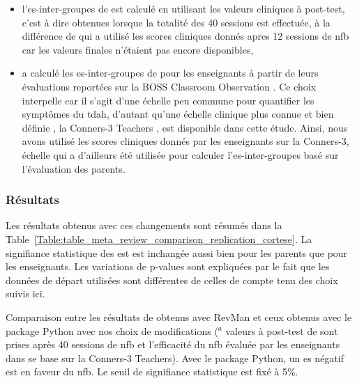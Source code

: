 \begin{itemize}
\item l'\gls{es}-inter-groupes de \citet{Arnold2014} est calculé en utilisant les valeurs cliniques à post-test, c'est à dire obtenues lorsque la totalité 
des 40 sessions est effectuée, à la différence de \citet{Cortese2016} qui a utilisé les scores cliniques donnés apres 12 sessions de \gls{nfb} car les valeurs 
finales n'étaient pas encore disponibles,
\item \citet{Cortese2016} a calculé les \gls{es}-inter-groupes de \citet{Steiner2014} pour les enseignants à partir de leurs évaluations reportées sur 
la BOSS Classroom Observation \citep{Shapiro2010}. Ce choix interpelle car il s'agit d'une échelle peu commune pour quantifier les symptômes du \gls{tdah}, d'autant qu'une échelle clinique 
plus connue et bien définie \citep{Collett2003, Epstein2012, Bluschke2016}, la Conners-3 Teachers \citep{Conners1998, Conners2008}, est disponible dans 
cette étude. Ainsi, nous avons utilisé les scores cliniques donnés par les enseignants sur la Conners-3, échelle 
qui a d'ailleurs été utilisée pour calculer l'\gls{es}-inter-groupes basé sur l'évaluation des parents. 
\end{itemize}

\subsubsection{Résultats}

Les résultats obtenus avec ces changements sont résumés dans la Table~\ref{Table:table_meta_review_comparison_replication_cortese}.
La signifiance statistique des \gls{est} est inchangée aussi bien pour les parents que pour les enseignants. Les variations de p-values sont expliquées
par le fait que les données de départ utilisées sont différentes de celles de \citet{Cortese2016} compte tenu des choix suivis ici.

\begin{table}[h!]
  \centering
  \caption{Comparaison entre les résultats de \citet{Cortese2016} obtenus avec RevMan \citep{Revman} et ceux obtenus avec le package Python \citep{Bussalb2019clinical}
	avec nos choix de modifications ($^a$ valeurs à post-test de \citet{Arnold2014} sont prises après 40 sessions de \gls{nfb} et l'efficacité du \gls{nfb} évaluée 
	par les enseignants dans \citet{Steiner2014} se base sur la Conners-3 Teachers).
	Avec le package Python, un \gls{es} négatif est en faveur du \gls{nfb}. Le seuil de signifiance statistique est fixé à 5\%.}
  
  \label{Table:table_meta_review_comparison_replication_cortese}
\end{table}

